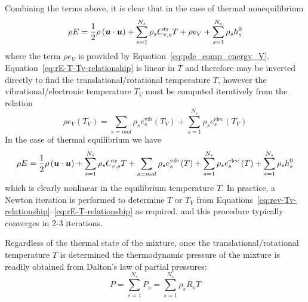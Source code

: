 Combining the terms above, it is clear that in the case of thermal nonequilibrium
\begin{equation}
  \label{eq:rE-T-Tv-relationship}
  \rho E =  \frac{1}{2}\rho\left({\boldsymbol{u}}\cdot{\boldsymbol{u}}\right) + \sum_{s=1}^{N_s} \rho_s C^{\text{tr}}_{v,s} T + \rho e_V  + \sum_{s=1}^{N_s} \rho_s h^0_s
\end{equation}
where the term $\rho e_V $ is provided by Equation~\eqref{eq:pde_comp_energy_V}.  Equation~\eqref{eq:rE-T-Tv-relationship} is linear in $T$ and therefore may be inverted directly to find the translational/rotational temperature $T$, however the vibrational/electronic temperature  $T_V$ must be computed iteratively from the relation
\begin{equation}
  \label{eq:rev-Tv-relationship}
  \rho e_V\left(T_V\right) = \sum_{s=mol} \rho_s e^{\text{vib}}_s\left(T_V\right) + \sum_{s=1}^{N_s} \rho_s e^{\text{elec}}_s\left(T_V\right)
\end{equation}
In the case of thermal equilibrium we have 
\begin{equation}
  \label{eq:rE-T-relationship}
  \rho E =  \frac{1}{2}\rho\left({\boldsymbol{u}}\cdot{\boldsymbol{u}}\right) + \sum_{s=1}^{N_s} \rho_s C^{\text{tr}}_{v,s} T + \sum_{s=mol} \rho_s e^{\text{vib}}_s\left(T\right) + \sum_{s=1}^{N_s} \rho_s e^{\text{elec}}_s\left(T\right) + \sum_{s=1}^{N_s} \rho_s h^0_s
\end{equation}
which is clearly nonlinear in the equilibrium temperature $T$.  In practice, a Newton iteration is performed to determine $T$ or $T_V$ from Equations~\eqref{eq:rev-Tv-relationship}--\eqref{eq:rE-T-relationship} as required, and this procedure typically converges in 2-3 iterations.  

Regardless of the thermal state of the mixture, once the translational/rotational temperature $T$ is determined the thermodynamic pressure of the mixture is readily obtained from Dalton's law of partial pressures:
\begin{equation}
  P = \sum_{s=1}^{N_s}  P_s = \sum_{s=1}^{N_s} \rho_s R_s T 
  \label{eq:p_eq_state}
\end{equation}

